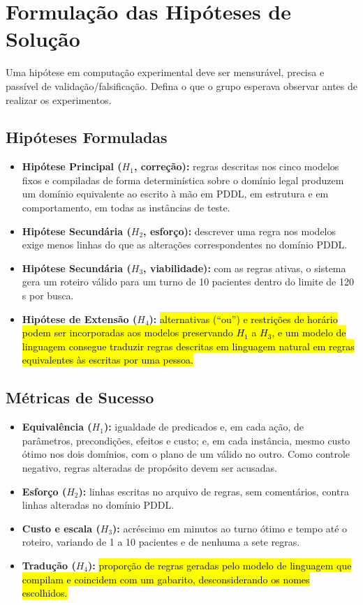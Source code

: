 \documentclass[11pt,a4paper]{article}
\newcommand{\pendente}[1]{\hl{#1}}
\begin{document}
\section{Formulação das Hipóteses de Solução}

\begin{instrucao}
Uma hipótese em computação experimental deve ser mensurável, precisa e passível de validação/falsificação. Defina o que o grupo esperava observar antes de realizar os experimentos.
\end{instrucao}

\subsection{Hipóteses Formuladas}
\begin{itemize}
    \item \textbf{Hipótese Principal ($H_1$, correção):} regras descritas nos cinco modelos fixos e compiladas de forma determinística sobre o domínio legal produzem um domínio equivalente ao escrito à mão em PDDL, em estrutura e em comportamento, em todas as instâncias de teste.
    \item \textbf{Hipótese Secundária ($H_2$, esforço):} descrever uma regra nos modelos exige menos linhas do que as alterações correspondentes no domínio PDDL.
    \item \textbf{Hipótese Secundária ($H_3$, viabilidade):} com as regras ativas, o sistema gera um roteiro válido para um turno de 10 pacientes dentro do limite de 120\,s por busca.
    \item \textbf{Hipótese de Extensão ($H_4$):} \pendente{alternativas (``ou'') e restrições de horário podem ser incorporadas aos modelos preservando $H_1$ a $H_3$, e um modelo de linguagem consegue traduzir regras descritas em linguagem natural em regras equivalentes às escritas por uma pessoa.}
\end{itemize}

\subsection{Métricas de Sucesso}
\begin{itemize}
    \item \textbf{Equivalência ($H_1$):} igualdade de predicados e, em cada ação, de parâmetros, precondições, efeitos e custo; e, em cada instância, mesmo custo ótimo nos dois domínios, com o plano de um válido no outro. Como controle negativo, regras alteradas de propósito devem ser acusadas.
    \item \textbf{Esforço ($H_2$):} linhas escritas no arquivo de regras, sem comentários, contra linhas alteradas no domínio PDDL.
    \item \textbf{Custo e escala ($H_3$):} acréscimo em minutos ao turno ótimo e tempo até o roteiro, variando de 1 a 10 pacientes e de nenhuma a sete regras.
    \item \textbf{Tradução ($H_4$):} \pendente{proporção de regras geradas pelo modelo de linguagem que compilam e coincidem com um gabarito, desconsiderando os nomes escolhidos.}
\end{itemize}
\end{document}
